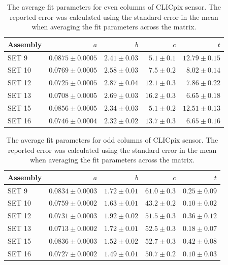 \begin{table}[h!]
\centering
\begin{tabular}{ l r r r r}
\hline
Assembly & $a$ & $b$ & $c$ & $t$ \\ 
\hline
SET 9   & $0.0875 \pm 0.0005$ & $2.41 \pm 0.03$ & $5.1 \pm 0.1$ & $12.79 \pm 0.15$ \\
SET 10 & $0.0769 \pm 0.0005$ & $2.58 \pm 0.03$ & $7.5 \pm 0.2$ & $8.02 \pm 0.14$ \\
SET 12 & $0.0725 \pm 0.0005$ & $2.87 \pm 0.04$ & $12.1 \pm 0.3$ & $7.86 \pm 0.22$  \\
SET 13 & $0.0708 \pm 0.0005$ & $2.69 \pm 0.03$ & $16.2 \pm 0.3$ & $6.65 \pm 0.18$ \\
SET 15 & $0.0856 \pm 0.0005$ & $2.34 \pm 0.03$ & $5.1 \pm 0.2$ & $12.51 \pm 0.13$ \\
SET 16 & $0.0746 \pm 0.0004$ & $2.32 \pm 0.02$ & $13.7 \pm 0.3$ & $6.65\pm 0.16$ \\
\hline
\end{tabular}
\caption[The average fit parameters for even columns of CLICpix sensor.  The reported error was calculated using the standard error in the mean when averaging the fit parameters across the matrix.]{The average fit parameters for even columns of CLICpix sensor.  The reported error was calculated using the standard error in the mean when averaging the fit parameters across the matrix.}
\label{table:clicpixfitparamseven}
\end{table}

\begin{table}[h!]
\centering
\begin{tabular}{ l r r r r}
\hline
Assembly & $a$ & $b$ & $c$ & $t$ \\ 
\hline
SET 9   & $0.0834 \pm 0.0003$ & $1.72 \pm 0.01$ & $61.0 \pm 0.3$ & $0.25 \pm 0.09$ \\
SET 10 & $0.0759 \pm 0.0002$ & $1.63 \pm 0.01$ & $43.2 \pm 0.2$ & $0.10 \pm 0.02$ \\
SET 12 & $0.0731 \pm 0.0003$ & $1.92 \pm 0.02$ & $51.5 \pm 0.3$ & $0.36 \pm 0.12$ \\
SET 13 & $0.0713 \pm 0.0002$ & $1.72 \pm 0.01$ & $52.5 \pm 0.3$ & $0.18 \pm 0.07$ \\
SET 15 & $0.0836 \pm 0.0003$ & $1.52 \pm 0.02$ & $52.7 \pm 0.3$ & $0.42 \pm 0.08$ \\
SET 16  & $0.0727 \pm 0.0002$ & $1.49 \pm 0.01$ & $50.7 \pm 0.2$ & $0.10 \pm 0.03$ \\
\hline
\end{tabular}
\caption[The average fit parameters for odd columns of CLICpix sensor.  The reported error was calculated using the standard error in the mean when averaging the fit parameters across the matrix.]{The average fit parameters for odd columns of CLICpix sensor.  The reported error was calculated using the standard error in the mean when averaging the fit parameters across the matrix.}\label{table:clicpixfitparamsodd}
\end{table}

